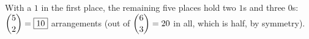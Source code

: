 With a $1$ in the first place, the remaining five places hold two $1$s and three $0$s: $\dbinom52=\boxed{10}$ arrangements (out of $\dbinom63=20$ in all, which is half, by symmetry).

